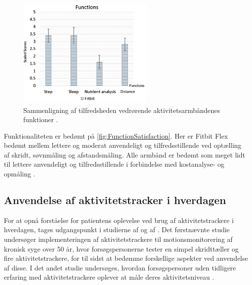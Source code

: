 \begin{figure}[H]
	\centering
	\includegraphics[width=0.6\textwidth]{figures/FunctionSatisfaction2}
	\caption{Sammenligning af tilfredsheden vedrørende aktivitetsarmbåndenes funktioner \citep{kaewkannate2016}.}
	\label{fig:FunctionSatisfaction}
\end{figure}

Funktionaliteten er bedømt på \autoref{fig:FunctionSatisfaction}. Her er Fitbit Flex bedømt mellem lettere og moderat anvendeligt og tilfredsstillende ved optælling af skridt, søvnmåling og afstandsmåling. Alle armbånd er bedømt som meget lidt til lettere anvendeligt og tilfredsstillende i forbindelse med kostanalyse- og opmåling \citep{kaewkannate2016}.

\subsection{Anvendelse af aktivitetstracker i hverdagen}

For at opnå forståelse for patientens oplevelse ved brug af aktivitetstrackere i hverdagen, tages udgangspunkt i studierne  af \citeauthor{mercer2016} og  af \citeauthor{rapp2016}. Det førstnævnte studie undersøger implementeringen af aktivitetstrackere til motionsmonitorering af kronisk syge over 50 år, hvor forsøgspersonerne tester en simpel skridttæller og fire aktivitetstrackere, for til sidst at bedømme forskellige aspekter ved anvendelse af disse. I det andet studie undersøges, hvordan forsøgspersoner uden tidligere erfaring med aktivitetstrackere oplever at måle deres aktivitetsniveau \citep{mercer2016, rapp2016}.

